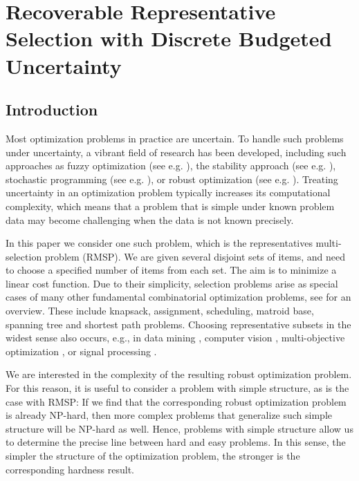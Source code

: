 \chapter{Recoverable Representative Selection with Discrete Budgeted Uncertainty}
\label{ch:recov-selection}

\section{Introduction}\label{sec:intro}


Most optimization problems in practice are uncertain. To handle such problems under uncertainty, a vibrant field of research has been developed, including such approaches as fuzzy optimization (see e.g. \cite{lodwick2010fuzzy,klir1995fuzzy}), the stability approach (see e.g. \cite{sotskov2014sequencing}), stochastic programming (see e.g. \cite{birge2011introduction}), or robust optimization (see e.g. \cite{kasperski2016robust}). Treating uncertainty in an optimization problem typically increases its computational complexity, which means that a problem that is simple under known problem data may become challenging when the data is not known precisely.

In this paper we consider one such problem, which is the representatives multi-selection problem (RMSP). We are given several disjoint sets of items, and need to choose a specified number of items from each set. The aim is to minimize a linear cost function. Due to their simplicity, selection problems arise as special cases of many other fundamental combinatorial optimization problems, see \cite{kasperski2013approximating} for an overview. These include knapsack, assignment, scheduling, matroid base, spanning tree and shortest path problems. Choosing representative subsets in the widest sense also occurs, e.g., in data mining \cite{daszykowski2002representative,wang2017representative}, computer vision \cite{meng2016keyframes}, multi-objective optimization \cite{zio2011clustering}, or signal processing \cite{wang2015novel}.

We are interested in the complexity of the resulting robust optimization problem. For this reason, it is useful to consider a problem with simple structure, as is the case with RMSP: If we find that the corresponding robust optimization problem is already NP-hard, then more complex problems that generalize such simple structure will be NP-hard as well. Hence, problems with simple structure allow us to determine the precise line between hard and easy problems. In this sense, the simpler the structure of the optimization problem, the stronger is the corresponding hardness result.

